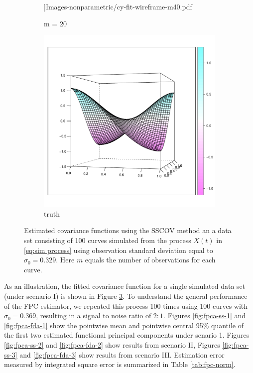 \begin{figure}
\begin{subfigure}
		\textwidth]{Images-nonparametric/cy-fit-wireframe-m40.pdf} \caption{m = 20} \label{} 
	\end{subfigure}
	\begin{subfigure}
		[b]{0.40 
		\textwidth} \centering 
		\includegraphics[width= 
		\textwidth]{Images-nonparametric/cy-true-wireframe.pdf} \caption{truth} \label{} 
	\end{subfigure}
	\caption{Estimated covariance functions using the SSCOV method an a data set consisting of 100 curves simulated from the process $X(t)$ in \eqref{eq:sim process} using observation standard deviation equal to $\sigma_0 = 0.329$. Here $m$ equals the number of observations for each curve. } \label{fig:covfits} 
\end{figure}

As an illustration, the fitted covariance function for a single simulated data set (under scenario I) is shown in Figure \ref{fig:covfits}. To understand the general performance of the FPC estimator, we repeated this process 100 times using 100 curves with $\sigma_0=0.369$, resulting in a signal to noise ratio of $2:1$. Figures \ref{fig:fpca-ss-1} and \ref{fig:fpca-fda-1} show the pointwise mean and pointwise central 95\% quantile of the first two estimated functional principal components under senario 1. Figures \ref{fig:fpca-ss-2} and \ref{fig:fpca-fda-2} show results from scenario II, Figures \ref{fig:fpca-ss-3} and \ref{fig:fpca-fda-3} show results from scenario III. Estimation error measured by integrated square error is summarized in Table \ref{tab:fpc-norm}. 

